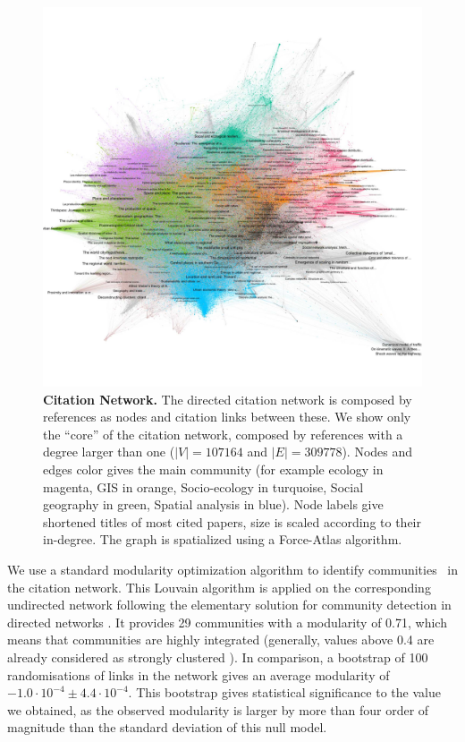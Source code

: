 \begin{figure}
\hspace{-2cm}
\includegraphics[width=1.6\textwidth]{figures/Fig5.jpg}
\caption{\textbf{Citation Network.} The directed citation network is composed by references as nodes and citation links between these. We show only the ``core'' of the citation network, composed by references with a degree larger than one ($\left|V\right| = 107164$ and $\left|E\right| = 309778$). Nodes and edges color gives the main community (for example ecology in magenta, GIS in orange, Socio-ecology in turquoise, Social geography in green, Spatial analysis in blue). Node labels give shortened titles of most cited papers, size is scaled according to their in-degree. The graph is spatialized using a Force-Atlas algorithm.}
\label{fig:citnw}
\end{figure}



We use a standard modularity optimization algorithm to identify communities~\citep{blondel2008fast} in the citation network. This Louvain algorithm is applied on the corresponding undirected network following the elementary solution for community detection in directed networks \citep{malliaros2013clustering}. It provides 29 communities with a modularity of 0.71, which means that communities are highly integrated (generally, values above 0.4 are already considered as strongly clustered \citep{newman2006modularity}). In comparison, a bootstrap of 100 randomisations of links in the network gives an average modularity of $-1.0\cdot 10^{-4} \pm 4.4\cdot 10^{-4}$. This bootstrap gives statistical significance to the value we obtained, as the observed modularity is larger by more than four order of magnitude than the standard deviation of this null model.


